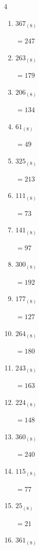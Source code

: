 \begin{multicols}{4}
\begin{enumerate}
        $=250$

  \item $367_{(8)}$

        $=247$

  \item $263_{(8)}$

        $=179$

  \item $206_{(8)}$

        $=134$

\columnbreak %

\resetques

  \item $61_{(8)}$

        $=49$

  \item $325_{(8)}$

        $=213$

  \item $111_{(8)}$

        $=73$

  \item $141_{(8)}$

        $=97$

  \item $300_{(8)}$

        $=192$

  \item $177_{(8)}$

        $=127$

  \item $264_{(8)}$

        $=180$

  \item $243_{(8)}$

        $=163$

  \item $224_{(8)}$

        $=148$

  \item $360_{(8)}$

        $=240$

  \item $115_{(8)}$

        $=77$

  \item $25_{(8)}$

        $=21$

  \item $361_{(8)}$


\end{enumerate}
\end{multicols}
